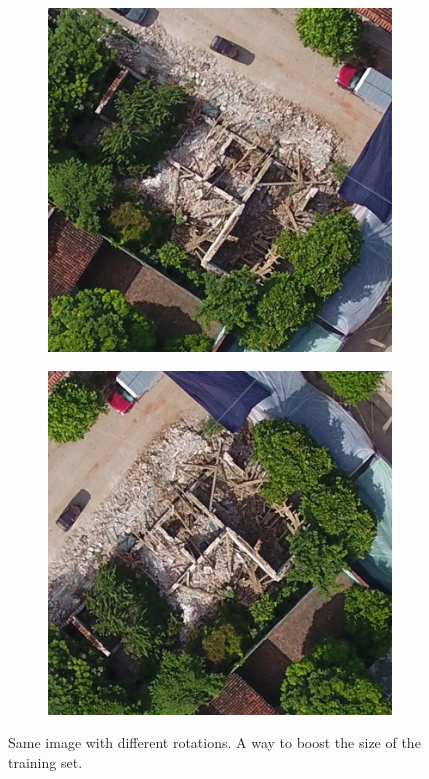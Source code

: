 \begin{figure}[!h]
\begin{subfigure}{.24\textwidth}
    \end{subfigure}
    \begin{subfigure}{.24\textwidth}
        \includegraphics[width=\textwidth]{images/rotation1.jpg}
    \end{subfigure}
    \begin{subfigure}{.24\textwidth}
        \includegraphics[width=\textwidth]{images/rotation2.jpg}
    \end{subfigure}
  \caption{Same image with different rotations. A way to boost the size of the training set.}
  \label{fig:rotate}
\end{figure}


